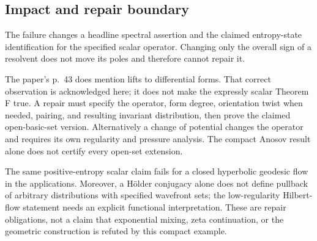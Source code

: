 \documentclass[10pt]{article}
\begin{document}
\subsection*{Impact and repair boundary}
The failure changes a headline spectral assertion and the claimed entropy-state identification for the specified scalar operator. Changing only the overall sign of a resolvent does not move its poles and therefore cannot repair it.\par
The paper’s p. 43 does mention lifts to differential forms. That correct observation is acknowledged here; it does not make the expressly scalar Theorem F true. A repair must specify the operator, form degree, orientation twist when needed, pairing, and resulting invariant distribution, then prove the claimed open-basic-set version. Alternatively a change of potential changes the operator and requires its own regularity and pressure analysis. The compact Anosov result alone does not certify every open-set extension.\par
The same positive-entropy scalar claim fails for a closed hyperbolic geodesic flow in the applications. Moreover, a Hölder conjugacy alone does not define pullback of arbitrary distributions with specified wavefront sets; the low-regularity Hilbert-flow statement needs an explicit functional interpretation. These are repair obligations, not a claim that exponential mixing, zeta continuation, or the geometric construction is refuted by this compact example.\par
\end{document}
